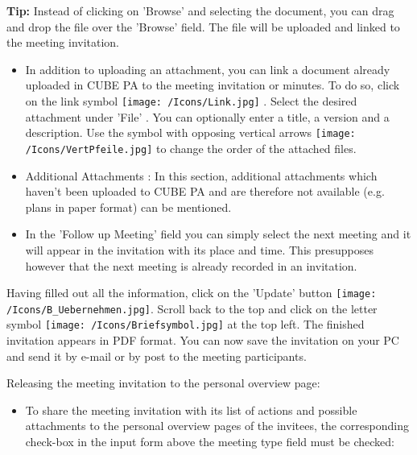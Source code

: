 \textbf{Tip:} Instead of clicking on 'Browse' and selecting the document, you can drag and drop the file over the 'Browse' field. The file will be uploaded and linked to the meeting invitation.

\vspace{\baselineskip}

\begin{itemize}
\item
In addition to uploading an attachment, you can link a document already uploaded in CUBE PA to the meeting invitation or minutes. To do so, click on the link symbol \texttt{[image: /Icons/Link.jpg]} . Select the desired attachment under 'File' . You can optionally enter a title, a version and a description. Use the symbol with opposing vertical arrows \texttt{[image: /Icons/VertPfeile.jpg]} to change the order of the attached files.
\end{itemize}

\begin{itemize}
\item
Additional Attachments : In this section, additional attachments which haven't been uploaded to CUBE PA and are therefore not available (e.g. plans in paper format) can be mentioned.
\item 
In the 'Follow up Meeting' field you can simply select the next meeting and it will appear in the invitation with its place and time. This presupposes however that the next meeting is already recorded in an invitation.
\end{itemize}

Having filled out all the information, click on the 'Update' button \texttt{[image: /Icons/B\_Uebernehmen.jpg]}. \newline
Scroll back to the top and click on the letter symbol \texttt{[image: /Icons/Briefsymbol.jpg]} at the top left. The finished invitation appears in PDF format. You can now save the invitation on your PC and send it by e-mail or by post to the meeting participants.

\vspace{\baselineskip}

Releasing the meeting invitation to the personal overview page:

\begin{itemize}
\item
To share the meeting invitation with its list of actions and possible attachments to the personal overview pages of the invitees, the corresponding check-box in the input form above the meeting type field must be checked:
\end{itemize}

